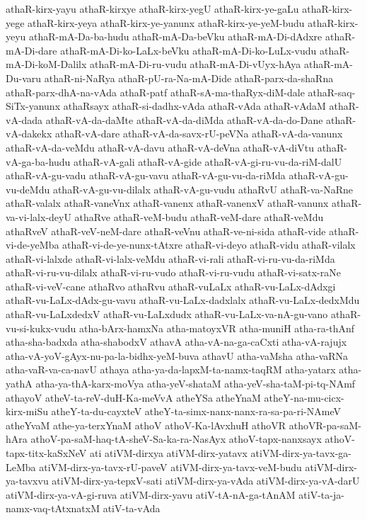 {athaR-kirx-yayu
athaR-kirxye
athaR-kirx-yegU
athaR-kirx-ye-gaLu
athaR-kirx-yege
athaR-kirx-yeya
athaR-kirx-ye-yanunx
athaR-kirx-ye-yeM-budu
athaR-kirx-yeyu
athaR-mA-Da-ba-hudu
athaR-mA-Da-beVku
athaR-mA-Di-dAdxre
athaR-mA-Di-dare
athaR-mA-Di-ko-LaLx-beVku
athaR-mA-Di-ko-LuLx-vudu
athaR-mA-Di-koM-Dalilx
athaR-mA-Di-ru-vudu
athaR-mA-Di-vUyx-hAya
athaR-mA-Du-varu
athaR-ni-NaRya
athaR-pU-ra-Na-mA-Dide
athaR-parx-da-shaRna
athaR-parx-dhA-na-vAda
athaR-patf
athaR-sA-ma-thaRyx-diM-dale
athaR-saq-SiTx-yanunx
athaRsayx
athaR-si-dadhx-vAda
athaR-vAda
athaR-vAdaM
athaR-vA-dada
athaR-vA-da-daMte
athaR-vA-da-diMda
athaR-vA-da-do-Dane
athaR-vA-dakekx
athaR-vA-dare
athaR-vA-da-savx-rU-peVNa
athaR-vA-da-vanunx
athaR-vA-da-veMdu
athaR-vA-davu
athaR-vA-deVna
athaR-vA-diVtu
athaR-vA-ga-ba-hudu
athaR-vA-gali
athaR-vA-gide
athaR-vA-gi-ru-vu-da-riM-dalU
athaR-vA-gu-vadu
athaR-vA-gu-vavu
athaR-vA-gu-vu-da-riMda
athaR-vA-gu-vu-deMdu
athaR-vA-gu-vu-dilalx
athaR-vA-gu-vudu
athaRvU
athaR-va-NaRne
athaR-valalx
athaR-vaneVnx
athaR-vanenx
athaR-vanenxV
athaR-vanunx
athaR-va-vi-lalx-deyU
athaRve
athaR-veM-budu
athaR-veM-dare
athaR-veMdu
athaRveV
athaR-veV-neM-dare
athaR-veVnu
athaR-ve-ni-sida
athaR-vide
athaR-vi-de-yeMba
athaR-vi-de-ye-nunx-tAtxre
athaR-vi-deyo
athaR-vidu
athaR-vilalx
athaR-vi-lalxde
athaR-vi-lalx-veMdu
athaR-vi-rali
athaR-vi-ru-vu-da-riMda
athaR-vi-ru-vu-dilalx
athaR-vi-ru-vudo
athaR-vi-ru-vudu
athaR-vi-satx-raNe
athaR-vi-veV-cane
athaRvo
athaRvu
athaR-vuLaLx
athaR-vu-LaLx-dAdxgi
athaR-vu-LaLx-dAdx-gu-vavu
athaR-vu-LaLx-dadxlalx
athaR-vu-LaLx-dedxMdu
athaR-vu-LaLxdedxV
athaR-vu-LaLxdudx
athaR-vu-LaLx-va-nA-gu-vano
athaR-vu-si-kukx-vudu
atha-bArx-hamxNa
atha-matoyxVR
atha-muniH
atha-ra-thAnf
atha-sha-badxda
atha-shabodxV
athavA
atha-vA-na-ga-caCxti
atha-vA-rajujx
atha-vA-yoV-gAyx-nu-pa-la-bidhx-yeM-buva
athavU
atha-vaMsha
atha-vaRNa
atha-vaR-va-ca-navU
athaya
atha-ya-da-lapxM-ta-namx-taqRM
atha-yatarx
atha-yathA
atha-ya-thA-karx-moVya
atha-yeV-shataM
atha-yeV-sha-taM-pi-tq-NAmf
athayoV
atheV-ta-reV-duH-Ka-meVvA
atheYSa
atheYnaM
atheY-na-mu-cicx-kirx-miSu
atheY-ta-du-cayxteV
atheY-ta-simx-nanx-nanx-ra-sa-pa-ri-NAmeV
atheYvaM
athe-ya-terxYnaM
athoV
athoV-Ka-lAvxhuH
athoVR
athoVR-pa-saM-hAra
athoV-pa-saM-haq-tA-sheV-Sa-ka-ra-NasAyx
athoV-tapx-nanxsayx
athoV-tapx-titx-kaSxNeV
ati
atiVM-dirxya
atiVM-dirx-yatavx
atiVM-dirx-ya-tavx-ga-LeMba
atiVM-dirx-ya-tavx-rU-paveV
atiVM-dirx-ya-tavx-veM-budu
atiVM-dirx-ya-tavxvu
atiVM-dirx-ya-tepxV-sati
atiVM-dirx-ya-vAda
atiVM-dirx-ya-vA-darU
atiVM-dirx-ya-vA-gi-ruva
atiVM-dirx-yavu
atiV-tA-nA-ga-tAnAM
atiV-ta-ja-namx-vaq-tAtxnatxM
atiV-ta-vAda
}
